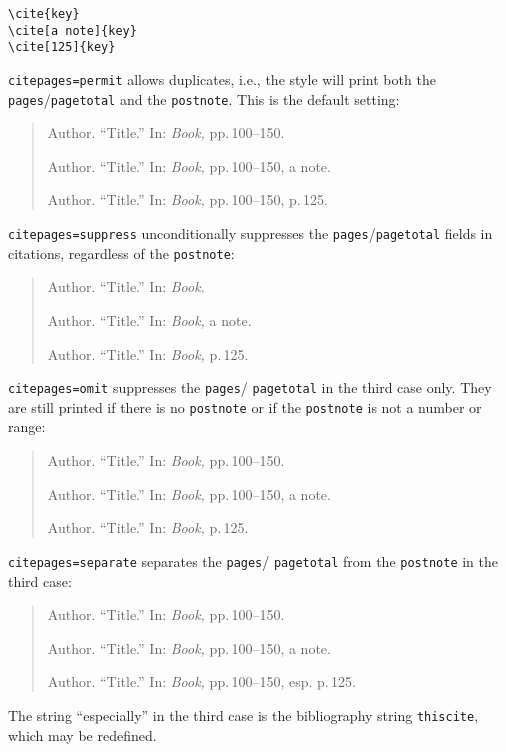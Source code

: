 \documentclass[a4paper]{article}
\begin{document}
\begin{verbatim}
\cite{key}
\cite[a note]{key}
\cite[125]{key}
\end{verbatim}
%
\texttt{citepages=permit} allows duplicates, i.e., the style will
print both the \texttt{pages}\slash \texttt{pagetotal} and the
\texttt{postnote}. This is the default setting:

\begin{quote}
Author. \enquote{Title.} In: \emph{Book,} pp.\,100--150.

Author. \enquote{Title.} In: \emph{Book,} pp.\,100--150, a note.

Author. \enquote{Title.} In: \emph{Book,} pp.\,100--150, p.\,125.
\end{quote}
%
\texttt{citepages=suppress} unconditionally suppresses the
\texttt{pages}\slash \texttt{pagetotal} fields in citations,
regardless of the \texttt{postnote}:

\begin{quote}
Author. \enquote{Title.} In: \emph{Book.}

Author. \enquote{Title.} In: \emph{Book,} a note.

Author. \enquote{Title.} In: \emph{Book,} p.\,125.
\end{quote}
%
\texttt{citepages=omit} suppresses the \texttt{pages}\slash
\texttt{pagetotal} in the third case only. They are still printed if
there is no \texttt{postnote} or if the \texttt{postnote} is not a
number or range:

\begin{quote}
Author. \enquote{Title.} In: \emph{Book,} pp.\,100--150.

Author. \enquote{Title.} In: \emph{Book,} pp.\,100--150, a note.

Author. \enquote{Title.} In: \emph{Book,} p.\,125.
\end{quote}
%
\texttt{citepages=separate} separates the \texttt{pages}\slash
\texttt{pagetotal} from the \texttt{postnote} in the third case:

\begin{quote}
Author. \enquote{Title.} In: \emph{Book,} pp.\,100--150.

Author. \enquote{Title.} In: \emph{Book,} pp.\,100--150, a note.

Author. \enquote{Title.} In: \emph{Book,} pp.\,100--150, esp. p.\,125.
\end{quote}
%
The string \enquote{especially} in the third case is the bibliography
string \texttt{thiscite}, which may be redefined.
\end{document}
